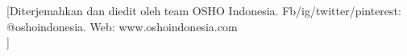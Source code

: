 \usepackage[pagestyles,extramarks]{titlesec}


\titleformat{\chapter}[hang]{\filleft\bfseries\large}{\MakeUppercase{\chaptertitlename\hspace{.5pt}\thechapter}}{.5em}{}[\vspace{2ex}\titlerule \small Diterjemahkan dan diedit oleh team OSHO Indonesia. Fb/ig/twitter/pinterest: @oshoindonesia. Web: www.oshoindonesia.com \\ \vspace{5ex}\titlerule]





